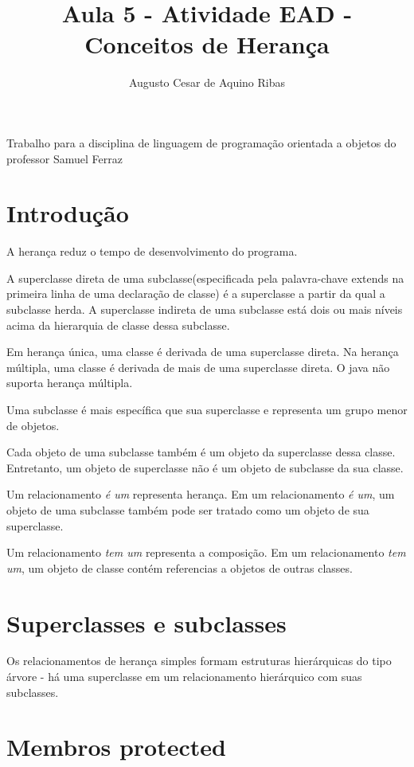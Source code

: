 \documentclass[a4paper,10pt]{article}
\title{Aula 5 - Atividade EAD - Conceitos de Herança}
\author{Augusto Cesar de Aquino Ribas}
\begin{document}
\maketitle
Trabalho para a disciplina de linguagem de programação orientada a objetos do professor Samuel Ferraz



\section{Introdução}

A herança reduz o tempo de desenvolvimento do programa.

A superclasse direta de uma subclasse(especificada pela palavra-chave extends na primeira linha de uma declaração de classe) é a superclasse a partir da qual a subclasse herda. A superclasse indireta de uma subclasse está dois ou mais níveis acima da hierarquia de classe dessa subclasse.

Em herança única, uma classe é derivada de uma superclasse direta. Na herança múltipla, uma classe é derivada de mais de uma superclasse direta. O java não suporta herança múltipla.

Uma subclasse é mais específica que sua superclasse e representa um grupo menor de objetos.

Cada objeto de uma subclasse também é um objeto da superclasse dessa classe. Entretanto, um objeto de superclasse não é um objeto de subclasse da sua classe.

Um relacionamento \emph{é um} representa herança. Em um relacionamento \emph{é um}, um objeto de uma subclasse também pode ser tratado como um objeto de sua superclasse.

Um relacionamento \emph{tem um} representa a composição. Em um relacionamento \emph{tem um}, um objeto de classe contém referencias a objetos de outras classes.

\section{Superclasses e subclasses}

Os relacionamentos de herança simples formam estruturas hierárquicas do tipo árvore - há uma superclasse em um relacionamento hierárquico com suas subclasses.

\section{Membros protected}
\end{document}
